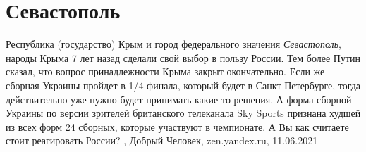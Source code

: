  
 
 
 
 
\chapter{Севастополь}

Республика (государство) Крым и город федерального значения \emph{Севастополь},
народы Крыма 7 лет назад сделали свой выбор в пользу России. Тем более Путин
сказал, что вопрос принадлежности Крыма закрыт окончательно. Если же сборная
Украины пройдет в 1/4 финала, который будет в Санкт-Петербурге, тогда
действительно уже нужно будет принимать какие то решения. А форма сборной
Украины по версии зрителей британского телеканала Sky Sports признана худшей из
всех форм 24 сборных, которые участвуют в чемпионате. А Вы как считаете стоит
реагировать России?
, 
Добрый Человек, zen.yandex.ru, 11.06.2021

